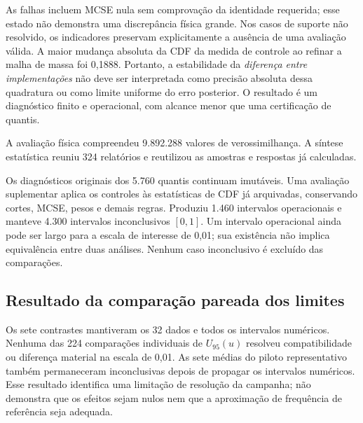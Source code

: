 As falhas incluem MCSE nula sem comprovação da identidade requerida;
esse estado não demonstra uma discrepância física grande. Nos casos
de suporte não resolvido, os indicadores preservam explicitamente a
ausência de uma avaliação válida. A maior mudança absoluta da CDF da
medida de controle ao refinar a malha de massa foi 0,1888. Portanto, a
estabilidade da \emph{diferença entre implementações} não deve ser
interpretada como precisão absoluta dessa quadratura ou como limite
uniforme do erro posterior. O resultado é um diagnóstico finito e
operacional, com alcance menor que uma certificação de quantis.

A avaliação física compreendeu 9.892.288 valores de verossimilhança.
A síntese estatística reuniu 324 relatórios e reutilizou as amostras
e respostas já calculadas.

Os diagnósticos originais dos 5.760 quantis continuam imutáveis.
Uma avaliação suplementar aplica os controles às estatísticas de CDF
já arquivadas, conservando cortes, MCSE, pesos e demais regras. Produziu
1.460 intervalos operacionais e manteve 4.300 intervalos inconclusivos
$[0,1]$. Um intervalo operacional ainda pode ser largo para a escala
de interesse de 0,01; sua existência não implica equivalência entre
duas análises. Nenhum caso inconclusivo é excluído das comparações.

\subsection{Resultado da comparação pareada dos limites}
\label{sec:comp-pareado-resultado}

Os sete contrastes mantiveram os 32 dados e todos os intervalos numéricos.
Nenhuma das 224 comparações individuais de $U_{95}(u)$ resolveu
compatibilidade ou diferença material na escala de 0,01. As sete médias
do piloto representativo também permaneceram inconclusivas depois de
propagar os intervalos numéricos. Esse resultado identifica uma
limitação de resolução da campanha; não demonstra que os efeitos sejam
nulos nem que a aproximação de frequência de referência seja adequada.

